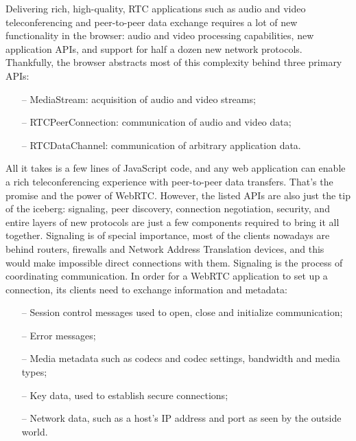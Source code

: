 Delivering rich, high-quality, RTC applications such as audio and video
teleconferencing and peer-to-peer data exchange requires a lot of new
functionality in the browser: audio and video processing capabilities, new
application APIs, and support for half a dozen new network protocols.
Thankfully, the browser abstracts most of this complexity behind three primary
APIs:
\begin{enumerate}
    \item[--]MediaStream: acquisition of audio and video streams;
    \item[--]RTCPeerConnection: communication of audio and video data;
    \item[--]RTCDataChannel: communication of arbitrary application data.
\end{enumerate}
All it takes is a few lines of JavaScript code, and any web application can
enable a rich teleconferencing experience with peer-to-peer data transfers.
That’s the promise and the power of WebRTC. However, the listed APIs are also
just the tip of the iceberg: signaling, peer discovery, connection negotiation,
security, and entire layers of new protocols are just a few components required
to bring it all together.
Signaling is of special importance, most of the clients nowadays are behind routers, firewalls
and Network Address Translation devices, and this would make impossible direct connections with them.
Signaling is the process of coordinating communication.
In order for a WebRTC application to set up a connection, its clients need to exchange information and metadata:
\begin{enumerate}
    \item[--] Session control messages used to open, close and initialize communication;
    \item[--] Error messages;
    \item[--] Media metadata such as codecs and codec settings, bandwidth and media types;
    \item[--] Key data, used to establish secure connections;
    \item[--] Network data, such as a host's IP address and port as seen by the outside world.
\end{enumerate}

